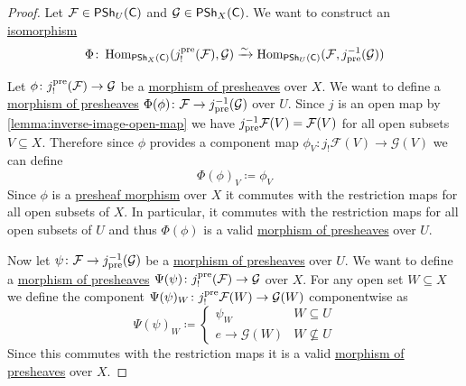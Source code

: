\documentclass[../../main]{subfiles}
\begin{document}
\begin{proof}
  Let \(\mathcal{F} \in \mathsf{PSh}_{U}(\mathsf{C})\) and \(\mathcal{G} \in \mathsf{PSh}_{X}(\mathsf{C})\).
  We want to construct an \hyperref[def:categorical-isomorphism]{isomorphism}
  \begin{equation*}
    \Phi\colon \operatorname{Hom}_{\mathsf{PSh}_{X}(\mathsf{C})}(j_{!}^{\operatorname*{pre}}(\mathcal{F}), \mathcal{G}) \xrightarrow{\sim} \operatorname{Hom}_{\mathsf{PSh}_{U}(\mathsf{C})}(\mathcal{F}, j_{\operatorname*{pre}}^{-1}(\mathcal{G}))
  \end{equation*}

  Let \(\phi\colon j_{!}^{\operatorname*{pre}}(\mathcal{F}) \to \mathcal{G}\) be a \hyperref[def:presheaf]{morphism of presheaves} over \(X\).
  We want to define a \hyperref[def:presheaf]{morphism of presheaves} \(\Phi(\phi)\colon \mathcal{F} \to j_{\operatorname*{pre}}^{-1}(\mathcal{G})\) over \(U\).
  Since \(j\) is an open map by \autoref{lemma:inverse-image-open-map} we have \(j_{\operatorname*{pre}}^{-1} \mathcal{F}(V) = \mathcal{F}(V)\) for all open subsets \(V \subseteq X\).
  Therefore since \(\phi\) provides a component map \(\phi_{V}\colon j_{!}\mathcal{F}(V) \to \mathcal{G}(V)\) we can define
  \begin{equation*}
    \Phi(\phi)_{V} \coloneq \phi_{V}
  \end{equation*}
  Since \(\phi\) is a \hyperref[def:presheaf]{presheaf morphism} over \(X\) it commutes with the restriction maps for all open subsets of \(X\).
  In particular, it commutes with the restriction maps for all open subsets of \(U\) and thus \(\Phi(\phi)\) is a valid \hyperref[def:presheaf]{morphism of presheaves} over \(U\).

  Now let \(\psi\colon \mathcal{F} \to j_{\operatorname*{pre}}^{-1}(\mathcal{G})\) be a \hyperref[def:presheaf]{morphism of presheaves} over \(U\).
  We want to define a \hyperref[def:presheaf]{morphism of presheaves} \(\Psi(\psi)\colon j_{!}^{\operatorname*{pre}}(\mathcal{F}) \to \mathcal{G}\) over \(X\).
  For any open set \(W \subseteq X\) we define the component \(\Psi(\psi)_{W}\colon j_{!}^{\operatorname*{pre}}\mathcal{F}(W) \to \mathcal{G}(W)\) componentwise as
  \begin{equation*}
    \Psi(\psi)_{W} \coloneq \begin{cases}
      \psi_{W} & W \subseteq U \\
      e \to \mathcal{G}(W) & W \not\subseteq U
    \end{cases}
  \end{equation*}
  Since this commutes with the restriction maps it is a valid \hyperref[def:presheaf]{morphism of presheaves} over \(X\).


\end{proof}
\end{document}
